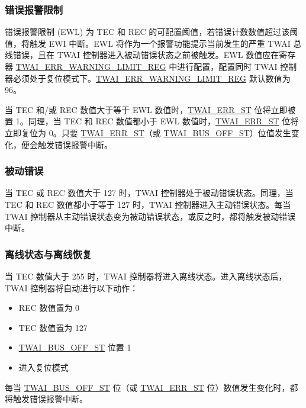 \documentclass[main\_\_CN.tex]{subfiles}
\begin{document}
\subsubsection{错误报警限制}

错误报警限制 (EWL) 为 TEC 和 REC 的可配置阈值，若错误计数数值超过该阈值，将触发 EWI 中断。EWL 将作为一个报警功能提示当前发生的严重 TWAI 总线错误，且在 TWAI 控制器进入被动错误状态之前被触发。EWL 数值应在寄存器 \hyperref[regdesc:TWAIERRWARNINGLIMITREG]{TWAI\_ERR\_WARNING\_LIMIT\_REG} 中进行配置，配置同时 TWAI 控制器必须处于复位模式下。\hyperref[regdesc:TWAIERRWARNINGLIMITREG]{TWAI\_ERR\_WARNING\_LIMIT\_REG} 默认数值为 96。

当 TEC 和/或 REC 数值大于等于 EWL 数值时，\hyperref[fielddesc:TWAIERRST]{TWAI\_ERR\_ST} 位将立即被置 1。同理，当 TEC 和 REC 数值都小于 EWL 数值时，\hyperref[fielddesc:TWAIERRST]{TWAI\_ERR\_ST} 位将立即复位为 0。只要 \hyperref[fielddesc:TWAIERRST]{TWAI\_ERR\_ST}（或 \hyperref[fielddesc:TWAIBUSOFFST]{TWAI\_BUS\_OFF\_ST}）位值发生变化，便会触发错误报警中断。

\subsubsection{被动错误}

当 TEC 或 REC 数值大于 127 时，TWAI 控制器处于被动错误状态。同理，当 TEC 和 REC 数值都小于等于 127 时，TWAI 控制器进入主动错误状态。每当 TWAI 控制器从主动错误状态变为被动错误状态，或反之时，都将触发被动错误中断。

\subsubsection{离线状态与离线恢复}

当 TEC 数值大于 255 时，TWAI 控制器将进入离线状态。进入离线状态后，TWAI 控制器将自动进行以下动作：

\begin{itemize}
    \item REC 数值置为 0
    \item TEC 数值置为 127
    \item \hyperref[fielddesc:TWAIBUSOFFST]{TWAI\_BUS\_OFF\_ST} 位置 1
    \item 进入复位模式
\end{itemize}

每当 \hyperref[fielddesc:TWAIBUSOFFST]{TWAI\_BUS\_OFF\_ST} 位（或 \hyperref[fielddesc:TWAIERRST]{TWAI\_ERR\_ST} 位）数值发生变化时，都将触发错误报警中断。
\end{document}

